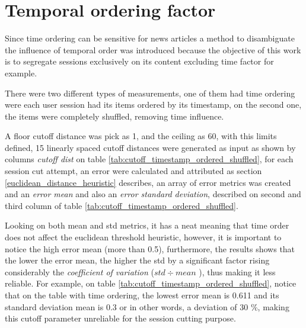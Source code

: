 \documentclass[ecp,tc,english]{iiufrgs}
\begin{document}
        \section{Temporal ordering factor} \label{temporal_ordering_factor}
        
        Since time ordering can be sensitive for news articles a method to disambiguate the influence of temporal order was introduced because the objective of this work is to segregate sessions exclusively on its content excluding time factor for example.
        
        There were two different types of measurements, one of them had time ordering were each user session had its items ordered by its timestamp, on the second one, the items were completely shuffled, removing time influence.
        
        A floor cutoff distance was pick as 1, and the ceiling as 60, with this limits defined, 15 linearly spaced cutoff distances were generated as input as shown by columns \textit{cutoff dist} on table \ref{tab:cutoff_timestamp_ordered_shuffled}, for each session cut attempt, an error were calculated and attributed as section \ref{euclidean_distance_heuristic} describes, an array of error metrics was created and an \textit{error mean} and also an \textit{error standard deviation}, described on second and third column of table \ref{tab:cutoff_timestamp_ordered_shuffled}.
        
        Looking on both mean and std metrics, it has a neat meaning that time order does not affect the euclidean threshold heuristic, however, it is important to notice the high error mean (more than 0.5), furthermore, the results shows that the lower the error mean, the higher the std by a significant factor rising considerably the \textit{coefficient of variation} (\(std \div mean\) ), thus making it less reliable. For example, on table \ref{tab:cutoff_timestamp_ordered_shuffled}, notice that on the table with time ordering, the lowest error mean is 0.611 and its standard deviation mean is 0.3 or in other words, a deviation of 30 \%, making this cutoff parameter unreliable for the session cutting purpose.
        
\end{document}
